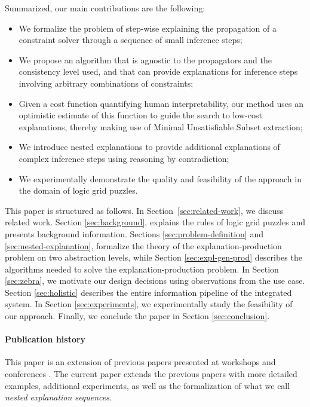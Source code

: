 Summarized, our main contributions are the following:
\begin{itemize}
	\item We formalize the problem of step-wise explaining the propagation of a constraint solver through a sequence of small inference steps;
	\item We propose an algorithm that is agnostic to the propagators and the consistency level used, and that can provide explanations for inference steps involving arbitrary combinations of constraints;
	\item Given a cost function quantifying human interpretability, our method uses an optimistic estimate of this function to guide the search to low-cost explanations, thereby making use of Minimal Unsatisfiable Subset extraction;
	\item We introduce nested explanations to provide additional explanations of complex inference steps using reasoning by contradiction;
	\item We experimentally demonstrate the quality and feasibility of the approach in the domain of logic grid puzzles.
\end{itemize}


This paper is structured as follows. In Section~\ref{sec:related-work}, we discuss related work. Section \ref{sec:background}, explains the rules of logic grid puzzles and presents background information. 
Sections \ref{sec:problem-definition} and \ref{sec:nested-explanation}, formalize the theory of the explanation-production problem on two abstraction levels, while Section \ref{sec:expl-gen-prod} describes the algorithms needed to solve the explanation-production problem.
In Section \ref{sec:zebra}, we motivate our design decisions using observations from the \ourtool use case. 
Section \ref{sec:holistic} describes the entire information pipeline of the \ourtool integrated system. 
In Section \ref{sec:experiments}, we experimentally study the feasibility of our approach. 
Finally, we conclude the paper in Section \ref{sec:conclusion}.


\paragraph{Publication history} This paper is an extension of previous papers presented at workshops and conferences \cite{claesuser,DBLP:conf/bnaic/ClaesBCGG19,ecai/BogaertsGCG20}. The current paper extends the previous papers with more detailed examples, additional experiments, as well as the formalization of what we call \emph{nested explanation sequences}.